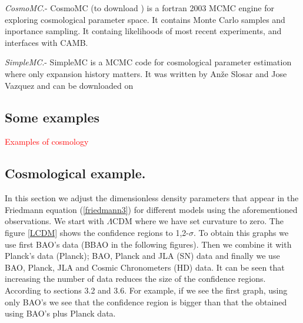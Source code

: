 \documentclass[onecolumn,           %
               showpacs,            %
               preprintnumbers,     %
               aps,                 %
               letterpaper,             %
               superscriptaddress,      %
               nofootinbib,         %
               tightenlines,        %
               floats,floatfix      %
               ,usenatbib,
               ]{revtex4-1}
\begin{document}
\textit{CosmoMC}.- CosmoMC (to download \cite{cosmomc}) is a fortran 2003 MCMC engine for exploring cosmological parameter space. It contains Monte Carlo samples and inportance sampling. It containg likelihoods of most recent experiments, and interfaces with CAMB.

\textit{SimpleMC}.- SimpleMC is a MCMC code for cosmological parameter estimation where only expansion history matters. It was written by Anže Slosar and Jose Vazquez and can be downloaded on \cite{simplemc}

\subsection{Some examples}
\textcolor{red}{Examples of cosmology}
\subsection{Cosmological example.}
In this section we adjust the dimensionless density parameters that appear in the Friedmann equation (\ref{friedmann3}) for different models using the aforementioned observations. We start with $\Lambda$CDM where we have set curvature to zero. The figure \ref{LCDM} shows the confidence regions to 1,2-$\sigma$. To obtain this graphs we use first BAO's data (BBAO in the following figures). Then we combine it with Planck's data (Planck); BAO, Planck and JLA (SN) data and finally we use BAO, Planck, JLA and Cosmic Chronometers (HD) data. It can be seen that increasing the number of data reduces the size of the confidence regions. According to sections 3.2 and 3.6. For example, if we see the first graph, using only BAO's we see that the confidence region is bigger than that the obtained using BAO's plus Planck data. 
\end{document}
